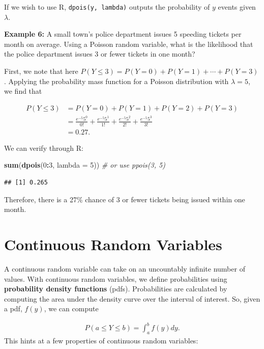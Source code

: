 \documentclass[
]{krantz}
\newenvironment{Shaded}{\begin{snugshade}}{\end{snugshade}}
\newcommand{\AttributeTok}[1]{\textcolor[rgb]{0.27,0.27,0.27}{#1}}
\newcommand{\CommentTok}[1]{\textcolor[rgb]{0.37,0.37,0.37}{\textit{#1}}}
\newcommand{\DecValTok}[1]{\textcolor[rgb]{0.06,0.06,0.06}{#1}}
\newcommand{\FunctionTok}[1]{\textcolor[rgb]{0.27,0.27,0.27}{\textbf{#1}}}
\newcommand{\NormalTok}[1]{#1}
\newcommand{\SpecialCharTok}[1]{\textcolor[rgb]{0.43,0.43,0.43}{\textbf{#1}}}
\begin{document}
If we wish to use R, \texttt{dpois(y,\ lambda)} outputs the probability of \(y\) events given \(\lambda\).

\textbf{Example 6:} A small town's police department issues 5 speeding tickets per month on average. Using a Poisson random variable, what is the likelihood that the police department issues 3 or fewer tickets in one month?

First, we note that here \(P(Y \le 3) = P(Y=0) + P(Y=1) + \cdots + P(Y=3)\). Applying the probability mass function for a Poisson distribution with \(\lambda = 5\), we find that

\begin{align*}
 P(Y \le 3) &= P(Y=0) + P(Y=1) + P(Y=2) + P(Y=3) \\
            &= \frac{e^{-5}5^0}{0!} + \frac{e^{-5}5^1}{1!} + \frac{e^{-5}5^2}{2!} + \frac{e^{-5}5^3}{3!}\\
            &= 0.27.
\end{align*}

We can verify through R:

\begin{Shaded}
\begin{Highlighting}[]
\FunctionTok{sum}\NormalTok{(}\FunctionTok{dpois}\NormalTok{(}\DecValTok{0}\SpecialCharTok{:}\DecValTok{3}\NormalTok{, }\AttributeTok{lambda =} \DecValTok{5}\NormalTok{))   }\CommentTok{\# or use ppois(3, 5)}
\end{Highlighting}
\end{Shaded}

\begin{verbatim}
## [1] 0.265
\end{verbatim}

Therefore, there is a 27\% chance of 3 or fewer tickets being issued within one month.

\section{Continuous Random Variables}\label{continuous-random-variables}

A continuous random variable can take on an uncountably infinite number of values. With continuous random variables, we define probabilities using \textbf{probability density functions} (pdfs).  Probabilities are calculated by computing the area under the density curve over the interval of interest. So, given a pdf, \(f(y)\), we can compute

\begin{align*}
P(a \le Y \le b) = \int_a^b f(y)dy.
\end{align*}
This hints at a few properties of continuous random variables:
\end{document}
